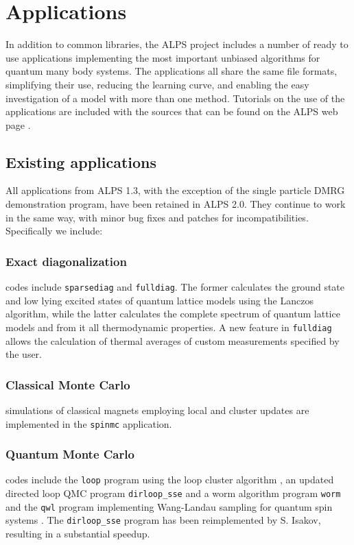 \documentclass[12pt]{iopart}
\begin{document}
\section{Applications}
\label{sec:applications}
In addition to common libraries, the ALPS project includes a number of ready to use applications implementing the most important unbiased
algorithms for quantum many body systems. The applications all
share the same file formats, simplifying their use, reducing the
learning curve, and enabling the easy investigation of a model with
more than one method. Tutorials on the use of the applications are
included with the sources that can be found on the ALPS web
page \cite{alps}.

\subsection{Existing applications}
All applications from ALPS 1.3, with the exception of the single particle DMRG demonstration program, have been retained in ALPS 2.0. They continue to work in the same way, with minor bug fixes and patches for incompatibilities. Specifically we include:

\subsubsection{Exact diagonalization}
codes include {\tt sparsediag} and {\tt fulldiag}. The former calculates the ground state
and low lying excited states of quantum lattice models using the
Lanczos \cite{lanczos} algorithm, while the latter calculates the complete
spectrum of quantum lattice models and from it all thermodynamic
properties. A new feature in {\tt fulldiag} allows the calculation of thermal averages of custom measurements specified by the user.


\subsubsection{Classical Monte Carlo} 
simulations of classical magnets employing local and cluster
updates \cite{Swendsen87} are implemented in the {\tt spinmc} application.

\subsubsection{Quantum Monte Carlo} codes include the {\tt loop}  program using the loop cluster
algorithm \cite{Evertz03,Todo01,looper}, an updated directed loop QMC \cite{Sylyuasen,Alet2005} program {\tt dirloop\_sse} and a  worm algorithm \cite{Prokofev98A} program  {\tt worm} and the {\tt qwl} program implementing Wang-Landau sampling for quantum spin systems \cite{Troyer03}. The {\tt dirloop\_sse} program has been reimplemented by S. Isakov, resulting in a substantial speedup.
\end{document}

